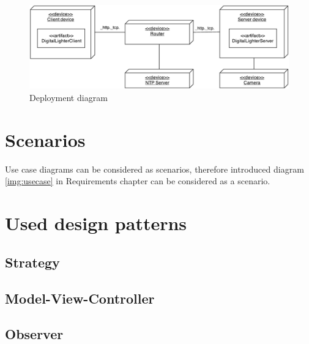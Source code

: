 \begin{figure}[H]
	\centering
		\includegraphics[width=15cm]{softwareArchitecture/deployment-diagram.pdf}
	\caption{Deployment diagram}
	\label{fig:architecture_deployment_diagram}
\end{figure}

\section{Scenarios}
Use case diagrams can be considered as scenarios, therefore introduced diagram \ref{img:usecase} in Requirements chapter can be considered as a scenario.

\section{Used design patterns}
\subsection{Strategy}
\subsection{Model-View-Controller}
\subsection{Observer}